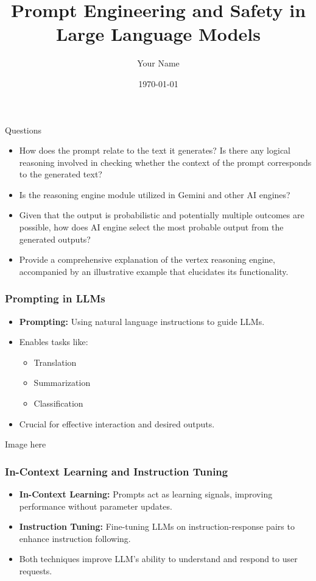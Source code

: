 \documentclass{beamer}
\title{Prompt Engineering and Safety in Large Language Models}
\author{Your Name}
\date{\today}
\begin{document}
\maketitle

\begin{frame}[fragile]
\begin{block}{Questions}
\begin{itemize}
\item How does the prompt relate to the text it generates? Is there any logical reasoning involved in checking whether the context of the prompt corresponds to the generated text?
\item Is the reasoning engine module utilized in Gemini and other AI engines?
\item Given that the output is probabilistic and potentially multiple outcomes are possible, how does AI engine select the most probable output from the generated outputs?
\item Provide a comprehensive explanation of the vertex reasoning engine, accompanied by an illustrative example that elucidates its functionality.
\end{itemize}
\end{block}
\end{frame}
\begin{frame}
    \frametitle{Prompting in LLMs}
    \begin{itemize}
        \item \textbf{Prompting:} Using natural language instructions to guide LLMs.
        \item Enables tasks like:
            \begin{itemize}
                \item Translation
                \item Summarization
                \item Classification
            \end{itemize}
        \item  Crucial for effective interaction and desired outputs.
    \end{itemize}
    Image here
\end{frame}

\begin{frame}
    \frametitle{In-Context Learning and Instruction Tuning}
    \begin{itemize}
        \item \textbf{In-Context Learning:} Prompts act as learning signals, improving performance without parameter updates.
        \item \textbf{Instruction Tuning:} Fine-tuning LLMs on instruction-response pairs to enhance instruction following.
        \item Both techniques improve LLM's ability to understand and respond to user requests.
    \end{itemize}
\end{frame}
\end{document}
